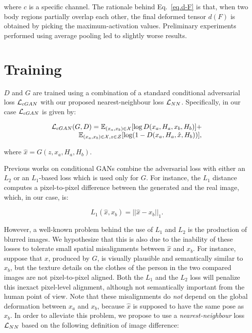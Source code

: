 \documentclass[10pt,twocolumn,letterpaper]{article}
\begin{document}
\noindent
where $c$ is a specific channel.
The rationale behind Eq.~\ref{eq.d-F} is that, when two body regions partially overlap each other, the final deformed tensor $d(F)$ is obtained by picking the  maximum-activation values. Preliminary experiments performed using  average pooling  led to slightly worse results.

\section{Training}
\label{Training}

$D$ and $G$ are trained using a combination of a standard conditional adversarial loss ${\cal L}_{cGAN}$ with our proposed nearest-neighbour loss ${\cal L}_{NN}$. Specifically, in our case 
${\cal L}_{cGAN}$ is given by:


\begin{equation}
\label{eq.GAN-loss}
\begin{array}{cc}
{\cal L}_{cGAN}(G,D)= &
\hspace{-7pt} \mathbb{E}_{(x_a,x_b) \in {\cal X}} [\log D(x_a, H_a, x_b, H_b)] + \\
 & \hspace{-40pt} \mathbb{E}_{(x_a,x_b) \in {\cal X}, z \in {\cal Z}} [\log ( 1 - D(x_a, H_a, \hat{x}, H_b ) )],
\end{array}
\end{equation}




\noindent
where $\hat{x} = G(z, x_a, H_a, H_b)$. 

Previous works on conditional GANs  combine the adversarial loss with either an $L_2$  \cite{DBLP:journals/corr/PathakKDDE16} or an $L_1$-based loss \cite{pix2pix2016,ma2017pose} which is used only for $G$. For instance, the $L_1$ distance computes a pixel-to-pixel difference between the generated and the real image, which, in our case, is:

\begin{equation}
L_1(\hat{x},x_b) =  ||\hat{x} - x_b ||_1.
\end{equation}

\noindent
However,
a well-known problem behind the use of $L_1$ and $L_2$ is the production of blurred images.
We hypothesize that this is also due to the inability of these losses to tolerate small spatial misalignments between $\hat{x}$ and $x_b$. For instance, suppose that 
$\hat{x}$, produced by $G$, is visually plausible and semantically similar to $x_b$, but the texture details on the clothes of the person in the two compared images are not pixel-to-pixel aligned. Both the $L_1$ and the $L_2$ loss will penalize this inexact pixel-level alignment, although not semantically important from the human point of view.
 Note that these misalignments do {\em not} depend on the global deformation between $x_a$ and $x_b$, because  $\hat{x}$ is supposed to have the same pose as $x_b$. In order to alleviate this problem, we propose to use a {\em nearest-neighbour} loss ${\cal L}_{NN}$ based on the following definition of image difference:
\end{document}
